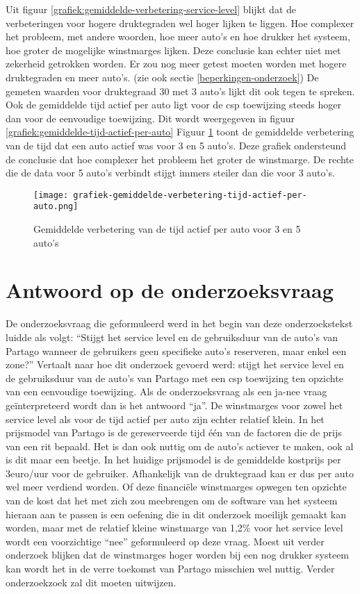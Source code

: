 Uit figuur \ref{grafiek:gemiddelde-verbetering-service-level} blijkt dat de verbeteringen voor hogere druktegraden wel hoger lijken te liggen. Hoe complexer het probleem, met andere woorden, hoe meer auto's en hoe drukker het systeem, hoe groter de mogelijke winstmarges lijken. Deze conclusie kan echter niet met zekerheid getrokken worden. Er zou nog meer getest moeten worden met hogere druktegraden en meer auto's. (zie ook sectie \ref{beperkingen-onderzoek}) De gemeten waarden voor druktegraad 30 met 3 auto's lijkt dit ook tegen te spreken.
Ook de gemiddelde tijd actief per auto ligt voor de csp toewijzing steeds hoger dan voor de eenvoudige toewijzing. Dit wordt weergegeven in figuur \ref{grafiek:gemiddelde-tijd-actief-per-auto} 
Figuur \ref{grafiek:gemiddelde-verbetering-tijd-actief} toont de gemiddelde verbetering van de tijd dat een auto actief was voor 3 en 5 auto's. Deze grafiek ondersteund de conclusie dat hoe complexer het probleem het groter de winstmarge. De rechte die de data voor 5 auto's verbindt stijgt immers steiler dan die voor 3 auto's.
\begin{figure}[h]
	\texttt{[image: grafiek-gemiddelde-verbetering-tijd-actief-per-auto.png]}
	\caption[Grafiek van de gemiddelde verbetering van de tijd actief per auto]{Gemiddelde verbetering van de tijd actief per auto voor 3 en 5 auto's}
	\label{grafiek:gemiddelde-verbetering-tijd-actief}
\end{figure}


\section{Antwoord op de onderzoeksvraag}
De onderzoeksvraag die geformuleerd werd in het begin van deze onderzoekstekst luidde als volgt: ``Stijgt het service level en de gebruiksduur van de auto's van Partago  wanneer de gebruikers geen specifieke auto's reserveren, maar enkel een zone?'' Vertaalt naar hoe dit onderzoek gevoerd werd: stijgt het service level en de gebruiksduur van de auto's van Partago met een csp toewijzing ten opzichte van een eenvoudige toewijzing. Als de onderzoeksvraag als een ja-nee vraag geïnterpreteerd wordt dan is het antwoord ``ja''. De winstmarges voor zowel het service level als voor de tijd actief per auto zijn echter relatief klein. In het prijsmodel van Partago is de gereserveerde tijd één van de factoren die de prijs van een rit bepaald. Het is dan ook nuttig om de auto's actiever te maken, ook al is dit maar een beetje. In het huidige prijsmodel is de gemiddelde kostprijs per 3euro/uur voor de gebruiker. Afhankelijk van de druktegraad kan er dus per auto wel meer verdiend worden. Of deze financiële winstmarges opwegen ten opzichte van de kost dat het met zich zou meebrengen om de software van het systeem hieraan aan te passen is een oefening die in dit onderzoek moeilijk gemaakt kan worden, maar met de relatief kleine winstmarge van 1,2\% voor het service level wordt een voorzichtige ``nee'' geformuleerd op deze vraag. Moest uit verder onderzoek blijken dat de winstmarges hoger worden bij een nog drukker systeem kan wordt het in de verre toekomst van Partago misschien wel nuttig. Verder onderzoekzoek zal dit moeten uitwijzen.

